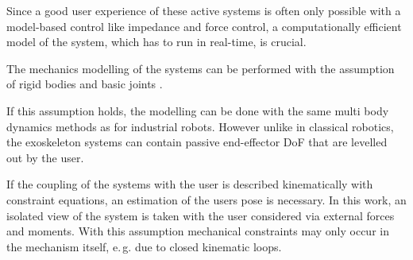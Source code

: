 \documentclass[twocolumn,10pt]{IFTOMM}
\begin{document}
Since a good user experience of these active systems is often only possible with a model-based control like impedance and force control, a computationally efficient model of the system, which has to run in real-time, is crucial.


The mechanics modelling of the systems can be performed with the assumption of rigid bodies and basic joints \cite{Pons2008}.

If this assumption holds, the modelling can be done with the same multi body dynamics methods as for industrial robots.
However unlike in classical robotics, the exoskeleton systems can contain passive end-effector DoF that are levelled out by the user.

If the coupling of the systems with the user is described kinematically with constraint equations, an estimation of the users pose is necessary.
In this work, an isolated view of the system is taken with the user considered via external forces and moments.
%
With this assumption mechanical constraints may only occur in the mechanism itself, e.\,g. due to closed kinematic loops.

\end{document}
